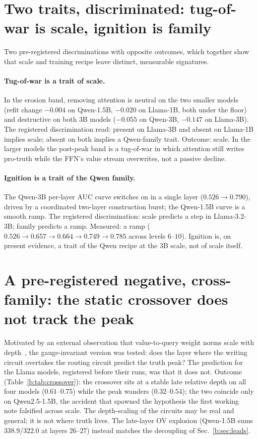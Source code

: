 \documentclass[11pt]{article}
\begin{document}
\section{Two traits, discriminated: tug-of-war is scale, ignition is family}
\label{b:sec:traits}

Two pre-registered discriminations with opposite outcomes, which together
show that scale and training recipe leave distinct, measurable signatures.

\paragraph{Tug-of-war is a trait of scale.} In the erosion band, removing
attention is neutral on the two smaller models (refit change $-0.004$ on
Qwen-1.5B, $-0.020$ on Llama-1B, both under the floor) and destructive on
both 3B models ($-0.055$ on Qwen-3B, $-0.147$ on Llama-3B). The registered
discrimination read: present on Llama-3B and absent on Llama-1B implies
scale; absent on both implies a Qwen-family trait. Outcome: scale. In the
larger models the post-peak band is a tug-of-war in which attention still
writes pro-truth while the FFN's value stream overwrites, not a passive
decline.

\paragraph{Ignition is a trait of the Qwen family.} The Qwen-3B per-layer
AUC curve switches on in a single layer ($0.526 \to 0.790$), driven by a
coordinated two-layer construction burst; the Qwen-1.5B curve is a smooth
ramp. The registered discrimination: scale predicts a step in Llama-3.2-3B;
family predicts a ramp. Measured: a ramp ($0.526 \to 0.657 \to 0.664 \to
0.749 \to 0.785$ across levels $6$--$10$). Ignition is, on present
evidence, a trait of the Qwen recipe at the 3B scale, not of scale itself.

\section{A pre-registered negative, cross-family: the static crossover does not track the peak}
\label{b:sec:negatives}

Motivated by an external observation that value-to-query weight norms scale
with depth~\cite{headgenome}, the gauge-invariant version was tested: does
the layer where the writing circuit overtakes the routing circuit predict
the truth peak? The prediction for the Llama models, registered before
their runs, was that it does not. Outcome (Table~\ref{b:tab:crossover}): the
crossover sits at a stable late relative depth on all four models
($0.61$--$0.75$) while the peak wanders ($0.32$--$0.54$); the two coincide
only on Qwen2.5-1.5B, the accident that spawned the hypothesis the first
working note falsified across scale. The depth-scaling of the circuits may
be real and general; it is not where truth lives. The late-layer OV
explosion (Qwen-1.5B sums $338.9$/$322.0$ at layers $26$--$27$) instead
matches the decoupling of Sec.~\ref{b:sec:leads}.
\end{document}
